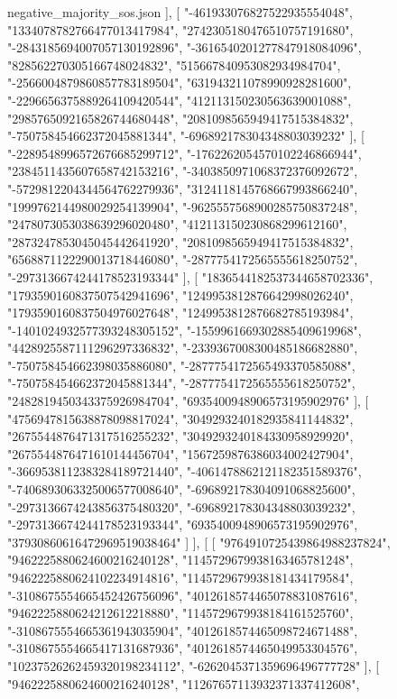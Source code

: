 \begin{filecontents*}[overwrite]{negative_majority_sos.json}
   ],
   [
    "-461933076827522935554048",
    "1334078782766477013417984",
    "2742305180476510757191680",
    "-2843185694007057130192896",
    "-3616540201277847918084096",
    "828562270305166748024832",
    "515667840953082934984704",
    "-2566004879860857783189504",
    "631943211078990928281600",
    "-2296656375889264109420544",
    "412113150230563639001088",
    "2985765092165826744680448",
    "2081098565949417515384832",
    "-750758454662372045881344",
    "-696892178304348803039232"
   ],
   [
    "-2289548996572676685299712",
    "-1762262054570102246866944",
    "2384511435607658742153216",
    "-3403850971068372376092672",
    "-5729812204344564762279936",
    "3124118145768667993866240",
    "1999762144980029254139904",
    "-9625557568900285750837248",
    "2478073053038639296020480",
    "412113150230868299612160",
    "2873247853045045442641920",
    "2081098565949417515384832",
    "6568871122290013718446080",
    "-2877754172565555618250752",
    "-2973136674244178523193344"
   ],
   [
    "1836544182537344658702336",
    "1793590160837507542941696",
    "1249953812876642998026240",
    "1793590160837504976027648",
    "1249953812876682785193984",
    "-1401024932577393248305152",
    "-1559961669302885409619968",
    "4428925587111296297336832",
    "-2339367008300485186682880",
    "-750758454662398035886080",
    "-2877754172565493370585088",
    "-750758454662372045881344",
    "-2877754172565555618250752",
    "2482819450343375926984704",
    "6935400948906573195902976"
   ],
   [
    "4756947815638878098817024",
    "3049293240182935841144832",
    "2675544876471317516255232",
    "3049293240184330958929920",
    "2675544876471610144456704",
    "1567259876386034002427904",
    "-3669538112383284189721440",
    "-4061478862121182351589376",
    "-7406893063325006577008640",
    "-696892178304091068825600",
    "-2973136674243856375480320",
    "-696892178304348803039232",
    "-2973136674244178523193344",
    "6935400948906573195902976",
    "37930860616472969519038464"
   ]
  ],
  [
   [
    "9764910725439864988237824",
    "9462225880624600216240128",
    "1145729679938163465781248",
    "9462225880624102234914816",
    "1145729679938181434179584",
    "-3108675554665452426756096",
    "4012618574465078831087616",
    "9462225880624212612218880",
    "1145729679938184161525760",
    "-3108675554665361943035904",
    "4012618574465098724671488",
    "-3108675554665417131687936",
    "4012618574465049953304576",
    "10237526262459320198234112",
    "-6262045371359696496777728"
   ],
   [
    "9462225880624600216240128",
    "11267657113932371337412608",

\end{filecontents*}
